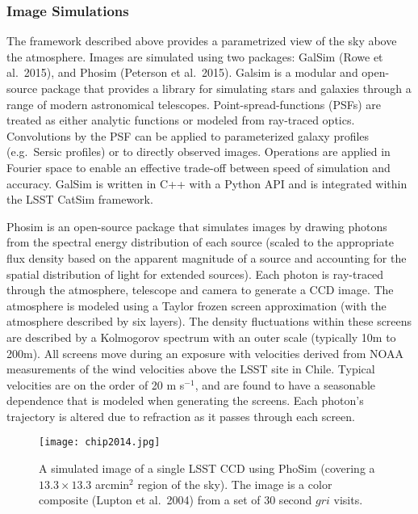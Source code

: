 {\subsubsection{Image Simulations}
\label{sec:imsim}

The framework described above provides a parametrized view of the sky
above the atmosphere. Images are simulated using two packages: GalSim
(Rowe et al.~2015), and Phosim (Peterson et al.~2015). Galsim is a
modular and open-source package that provides a library for simulating
stars and galaxies through a range of modern astronomical
telescopes. Point-spread-functions (PSFs) are treated as either
analytic functions or modeled from ray-traced optics. Convolutions by
the PSF can be applied to parameterized galaxy profiles (e.g.\
Sersic profiles) or to directly observed images. Operations are
applied in Fourier space to enable an effective trade-off between
speed of simulation and accuracy. GalSim is written in C++ with a
Python API and is integrated within the LSST CatSim framework.

Phosim is an open-source package that simulates images by drawing
photons from the spectral energy distribution of each source (scaled
to the appropriate flux density based on the apparent magnitude of a
source and accounting for the spatial distribution of light for
extended sources). Each photon is ray-traced through the atmosphere,
telescope and camera to generate a CCD image. The atmosphere is
modeled using a Taylor frozen screen approximation (with the
atmosphere described by six layers). The density fluctuations within
these screens are described by a Kolmogorov spectrum with an outer
scale (typically 10m to 200m). All screens move during an exposure
with velocities derived from NOAA measurements of the wind velocities
above the LSST site in Chile.  Typical velocities are on the order of
20 m s$^{-1}$, and are found to have a seasonable dependence that is
modeled when generating the screens. Each photon's trajectory is
altered due to refraction as it passes through each screen.


\begin{figure*}
\centerline{\texttt{[image: chip2014.jpg]}}
\caption{ A simulated image of a single LSST CCD using PhoSim
  (covering a $13.3\times13.3$ arcmin$^2$ region of the sky). The
  image is a color composite (Lupton et al.~2004) from a set of 30
  second $gri$ visits.}
\label{Fig:ImSimExample}
\end{figure*}

}
